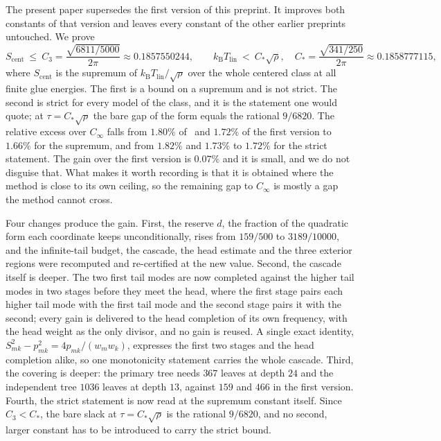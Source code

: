 \documentclass[10pt]{article}
\theoremstyle{remark}
\newcommand{\kB}{k_{\mathrm B}}
\newcommand{\Tlin}{T_{\mathrm{lin}}}
\newcommand{\Cinf}{C_\infty}
\newcommand{\Cstar}{C_{*}}
\newcommand{\Cthree}{C_{3}}
\begin{document}
The present paper supersedes the first version of this preprint. It improves both constants of that version and leaves every constant of the other earlier preprints untouched. We prove
\[
S_{\mathrm{cent}}\ \le\ \Cthree=\frac{\sqrt{6811/5000}}{2\pi}\approx0.1857550244,
\qquad
\kB\Tlin\ <\ \Cstar\sqrt{\rho},\quad \Cstar=\frac{\sqrt{341/250}}{2\pi}\approx0.1858777115,
\]
where $S_{\mathrm{cent}}$ is the supremum of $\kB\Tlin/\sqrt{\rho}$ over the whole centered class at all finite glue energies. The first is a bound on a supremum and is not strict. The second is strict for every model of the class, and it is the statement one would quote; at $\tau=\Cstar\sqrt{\rho}$ the bare gap of the form equals the rational $9/6820$. The relative excess over $\Cinf$ falls from $1.80\%$ of~\cite{finiteenergy} and $1.72\%$ of the first version to $1.66\%$ for the supremum, and from $1.82\%$ and $1.73\%$ to $1.72\%$ for the strict statement. The gain over the first version is $0.07\%$ and it is small, and we do not disguise that. What makes it worth recording is that it is obtained where the method is close to its own ceiling, so the remaining gap to $\Cinf$ is mostly a gap the method cannot cross.

Four changes produce the gain. First, the reserve $d$, the fraction of the quadratic form each coordinate keeps unconditionally, rises from $159/500$ to $3189/10000$, and the infinite-tail budget, the cascade, the head estimate and the three exterior regions were recomputed and re-certified at the new value. Second, the cascade itself is deeper. The two first tail modes are now completed against the higher tail modes in two stages before they meet the head, where the first stage pairs each higher tail mode with the first tail mode and the second stage pairs it with the second; every gain is delivered to the head completion of its own frequency, with the head weight as the only divisor, and no gain is reused. A single exact identity, $S_{mk}^2-p_{mk}^2=4p_{mk}/(w_mw_k)$, expresses the first two stages and the head completion alike, so one monotonicity statement carries the whole cascade. Third, the covering is deeper: the primary tree needs $367$ leaves at depth $24$ and the independent tree $1036$ leaves at depth $13$, against $159$ and $466$ in the first version. Fourth, the strict statement is now read at the supremum constant itself. Since $\Cthree<\Cstar$, the bare slack at $\tau=\Cstar\sqrt\rho$ is the rational $9/6820$, and no second, larger constant has to be introduced to carry the strict bound.
\end{document}

